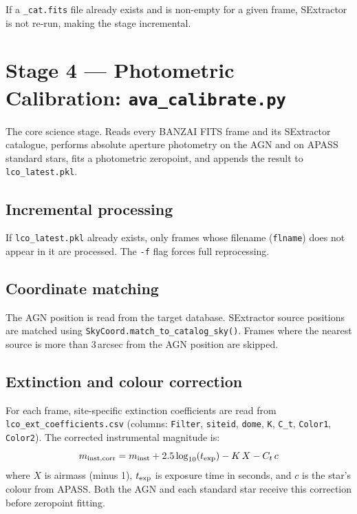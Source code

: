 \documentclass[12pt,a4paper]{article}
\begin{document}
If a \texttt{\_cat.fits} file already exists and is non-empty for a given frame,
SExtractor is not re-run, making the stage incremental.

\section{Stage 4 --- Photometric Calibration: \texorpdfstring{\texttt{ava\_calibrate.py}}{ava_calibrate.py}}
\label{sec:calibrate}

The core science stage.  Reads every BANZAI FITS frame and its SExtractor catalogue,
performs absolute aperture photometry on the AGN and on APASS standard stars, fits a
photometric zeropoint, and appends the result to \texttt{lco\_latest.pkl}.

\subsection{Incremental processing}

If \texttt{lco\_latest.pkl} already exists, only frames whose filename (\texttt{flname})
does not appear in it are processed.  The \texttt{-f} flag forces full reprocessing.

\subsection{Coordinate matching}

The AGN position is read from the target database.  SExtractor source positions are matched
using \texttt{SkyCoord.match\_\hspace{0pt}to\_\hspace{0pt}catalog\_\hspace{0pt}sky()}.  Frames where the nearest source is more
than 3\,arcsec from the AGN position are skipped.

\subsection{Extinction and colour correction}

For each frame, site-specific extinction coefficients are read from
\texttt{lco\_\hspace{0pt}ext\_\hspace{0pt}coefficients.csv} (columns: \texttt{Filter}, \texttt{siteid},
\texttt{dome}, \texttt{K}, \texttt{C\_t}, \texttt{Color1}, \texttt{Color2}).
The corrected instrumental magnitude is:
\begin{equation}
  m_{\rm inst,corr} = m_{\rm inst} + 2.5\log_{10}(t_{\rm exp}) - K\,X - C_t\,c
  \label{eq:ext}
\end{equation}
where $X$ is airmass (minus 1), $t_{\rm exp}$ is exposure time in seconds, and $c$ is the
star's colour from APASS.  Both the AGN and each standard star receive this correction
before zeropoint fitting.
\end{document}
